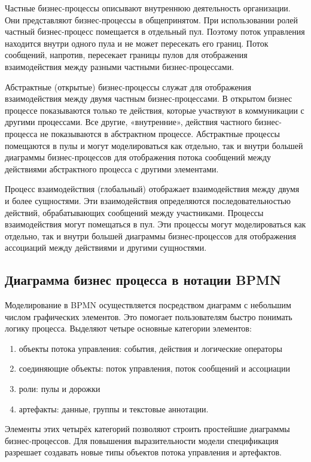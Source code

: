 \documentclass[russian,utf8,emptystyle]{eskdtext}
\begin{document}
Частные бизнес-процессы описывают внутреннюю деятельность организации. Они представляют бизнес-процессы в общепринятом. При использовании ролей частный бизнес-процесс помещается в отдельный пул. Поэтому поток управления находится внутри одного пула и не может пересекать его границ. Поток сообщений, напротив, пересекает границы пулов для отображения взаимодействия между разными частными бизнес-процессами.

Абстрактные (открытые) бизнес-процессы служат для отображения взаимодействия между двумя частным бизнес-процессами. В открытом бизнес процессе показываются только те действия, которые участвуют в коммуникации с другими процессами. Все другие, «внутренние», действия частного бизнес-процесса не показываются в абстрактном процессе. Абстрактные процессы помещаются в пулы и могут моделироваться как отдельно, так и внутри большей диаграммы бизнес-процессов для отображения потока сообщений между действиями абстрактного процесса с другими элементами.

Процесс взаимодействия (глобальный) отображает взаимодействия между двумя и более сущностями. Эти взаимодействия определяются последовательностью действий, обрабатывающих сообщений между участниками. Процессы взаимодействия могут помещаться в пул. Эти процессы могут моделироваться как отдельно, так и внутри большей диаграммы бизнес-процессов для отображения ассоциаций между действиями и другими сущностями.

\clearpage
\subsection{Диаграмма бизнес процесса в нотации BPMN}
Моделирование в BPMN осуществляется посредством диаграмм с небольшим числом графических элементов. Это помогает пользователям быстро понимать логику процесса. Выделяют четыре основные категории элементов:
\begin{enumerate}[label=\arabic*]
\item объекты потока управления: события, действия и логические операторы
\item соединяющие объекты: поток управления, поток сообщений и ассоциации
\item роли: пулы и дорожки
\item артефакты: данные, группы и текстовые аннотации.
\end{enumerate}

Элементы этих четырёх категорий позволяют строить простейшие диаграммы бизнес-процессов. Для повышения выразительности модели спецификация разрешает создавать новые типы объектов потока управления и артефактов.
\end{document}
